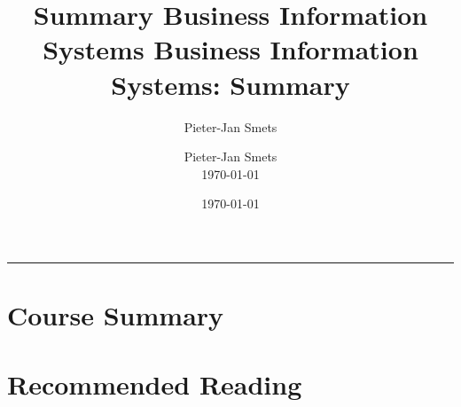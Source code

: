 \documentclass[10pt,a4paper]{article}
\author{Pieter-Jan Smets}
\title{Summary Business Information Systems}
\date{\today}
\title{	\fontsize{40}{60}\selectfont
			\vspace*{0.7cm}
			\hfill Business Information\\[0.8cm]%
      \hfill Systems: Summary\\[0.8cm]%
}
\author{
		\hfill Pieter-Jan Smets\\
		\hfill \today \\
}
\makeatletter
\newcommand{\HRule}[1]{\hfill \rule{0.2\linewidth}{#1}} 	%
\def\printtitle{%
    {\centering \@title\par}}
\def\printauthor{%
    {\centering \large \@author}}
\makeatother
\begin{document}
\thispagestyle{empty}				%

\colorbox{grey}{
	\parbox[t]{1.0\linewidth}{
		\printtitle
		\vspace*{0.7cm}
	}
}

  	\vfill
\printauthor								%
\HRule{1pt}
\clearpage


\tableofcontents
\newpage

\listoffigures
\newpage




\newpage
\part{Course Summary}

\newpage
\part{Recommended Reading}
\end{document}
